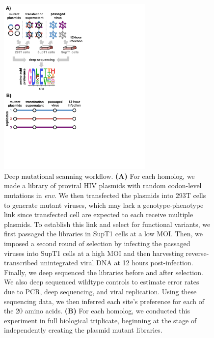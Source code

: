 \documentclass[9pt,lineno]{elife}
\begin{document}
\begin{figure}
\centerline{\includegraphics[width=3in]{figures/dms_schematic/dms_schematic}}
\caption{\label{fig:dms_schematic}
Deep mutational scanning workflow.
{\bf (A)} For each homolog, we made a library of proviral HIV plasmids with random codon-level mutations in \textit{env}.
We then transfected the plasmids into 293T cells to generate mutant viruses, which may lack a genotype-phenotype link since transfected cell are expected to each receive multiple plasmids.
To establish this link and select for functional variants, we first passaged the libraries in SupT1 cells at a low MOI.
Then, we imposed a second round of selection by infecting the passaged viruses into SupT1 cells at a high MOI and then harvesting reverse-transcribed unintegrated viral DNA at 12 hours post-infection.
Finally, we deep sequenced the libraries before and after selection.
We also deep sequenced wildtype controls to estimate error rates due to PCR, deep sequencing, and viral replication.
Using these sequencing data, we then inferred each site's preference for each of the 20 amino acids.
{\bf (B)} For each homolog, we conducted this experiment in full biological triplicate, beginning at the stage of independently creating the plasmid mutant libraries.
}
\end{figure}
\end{document}
